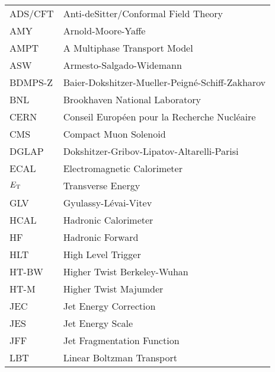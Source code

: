 
\begin{table}[htbp]

\begin{tabular}{l l}

ADS/CFT & Anti-deSitter/Conformal Field Theory\\

AMY & Arnold-Moore-Yaffe\\

AMPT & A Multiphase Transport Model \\

ASW & Armesto-Salgado-Widemann\\ 

BDMPS-Z & Baier-Dokshitzer-Mueller-Peign\'{e}-Schiff-Zakharov\\

BNL & Brookhaven National Laboratory\\

CERN & Conseil Europ\'{e}en pour la Recherche Nucl\'{e}aire\\

CMS & Compact Muon Solenoid \\

DGLAP & Dokshitzer-Gribov-Lipatov-Altarelli-Parisi \\

ECAL & Electromagnetic Calorimeter\\

$E_{\rm T}$ & Transverse Energy\\

GLV & Gyulassy-L\'{e}vai-Vitev\\

HCAL & Hadronic Calorimeter\\

HF & Hadronic Forward\\

HLT & High Level Trigger \\ 

HT-BW & Higher Twist Berkeley-Wuhan\\

HT-M & Higher Twist Majumder\\

JEC & Jet Energy Correction\\

JES & Jet Energy Scale\\

JFF  & Jet Fragmentation Function \\

LBT & Linear Boltzman Transport\\


\end{tabular}
\end{table}
